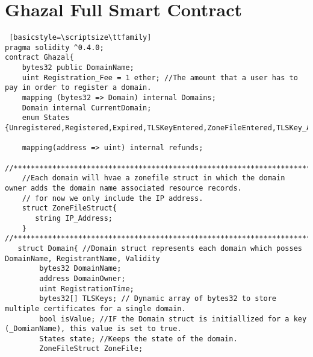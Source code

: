 \chapter{Ghazal Full Smart Contract}

\begin{lstlisting} [basicstyle=\scriptsize\ttfamily]
pragma solidity ^0.4.0;
contract Ghazal{
    bytes32 public DomainName;
    uint Registration_Fee = 1 ether; //The amount that a user has to pay in order to register a domain.
    mapping (bytes32 => Domain) internal Domains;
    Domain internal CurrentDomain;
    enum States {Unregistered,Registered,Expired,TLSKeyEntered,ZoneFileEntered,TLSKey_And_ZoneFileEntered}

    mapping(address => uint) internal refunds;

//************************************************************************************************************************//
    //Each domain will hvae a zonefile struct in which the domain owner adds the domain name associated resource records.
    // for now we only include the IP address.
    struct ZoneFileStruct{
       string IP_Address;
    }
//************************************************************************************************************************//
   struct Domain{ //Domain struct represents each domain which posses DomainName, RegistrantName, Validity
        bytes32 DomainName;
        address DomainOwner;
        uint RegistrationTime;
        bytes32[] TLSKeys; // Dynamic array of bytes32 to store multiple certificates for a single domain.
        bool isValue; //IF the Domain struct is initiallized for a key (_DomianName), this value is set to true.
        States state; //Keeps the state of the domain.
        ZoneFileStruct ZoneFile;


\end{lstlisting}
